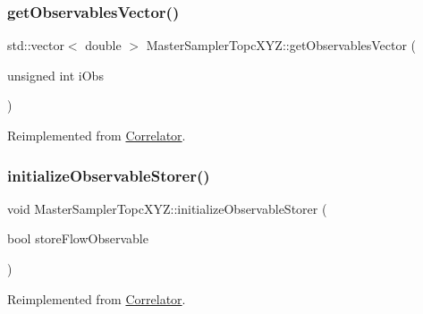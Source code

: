 \subsubsection{\texorpdfstring{getObservablesVector()}{getObservablesVector()}}
{\footnotesize\ttfamily std\+::vector$<$ double $>$ Master\+Sampler\+Topc\+X\+Y\+Z\+::get\+Observables\+Vector (\begin{DoxyParamCaption}\item[{unsigned int}]{i\+Obs }\end{DoxyParamCaption})\hspace{0.3cm}{\ttfamily [virtual]}}



Reimplemented from \mbox{\hyperlink{class_correlator_a7fb062b098beb078f3e546f4717b4941}{Correlator}}.

\mbox{\label{class_master_sampler_topc_x_y_z_af6d2cf2023d9626908fd26b07a7a0b84}} 
\subsubsection{\texorpdfstring{initializeObservableStorer()}{initializeObservableStorer()}}
{\footnotesize\ttfamily void Master\+Sampler\+Topc\+X\+Y\+Z\+::initialize\+Observable\+Storer (\begin{DoxyParamCaption}\item[{bool}]{store\+Flow\+Observable }\end{DoxyParamCaption})\hspace{0.3cm}{\ttfamily [virtual]}}



Reimplemented from \mbox{\hyperlink{class_correlator_ab99886c09dd27dfc8676d0032cecf9bc}{Correlator}}.


